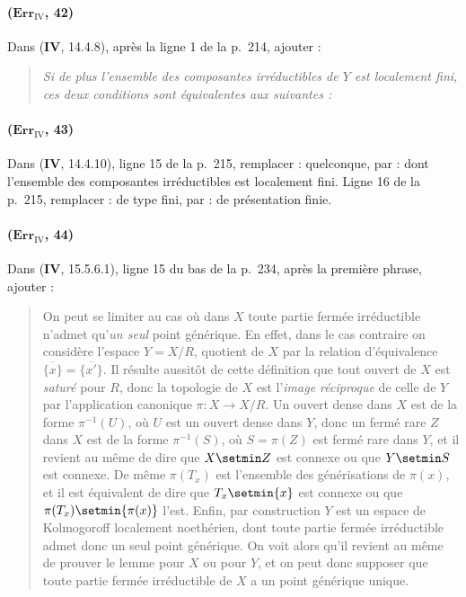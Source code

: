 \paragraph{($\mathbf{Err}_{\mathrm{IV}}$, 42)}
Dans (\textbf{IV}, 14.4.8), après la ligne 1 de la p.~214, ajouter :
\begin{quote}
\emph{Si de plus l'ensemble des composantes irréductibles de $Y$ est
localement fini, ces deux conditions sont équivalentes aux suivantes :}
\end{quote}

\paragraph{($\mathbf{Err}_{\mathrm{IV}}$, 43)}
Dans (\textbf{IV}, 14.4.10), ligne 15 de la p.~215, remplacer : quelconque, par :
dont l'ensemble des composantes irréductibles est localement fini.
Ligne 16 de la p.~215, remplacer : de type fini, par : de présentation
finie.

\paragraph{($\mathbf{Err}_{\mathrm{IV}}$, 44)}
Dans (\textbf{IV}, 15.5.6.1), ligne 15 du bas de la p.~234, après la première
phrase, ajouter :

\begin{quote}
On peut se limiter au cas où dans $X$ toute partie fermée irréductible
n'admet qu'\emph{un seul} point générique. En effet, dans le cas contraire on
considère l'espace $Y=X/R$,
quotient de $X$ par la relation d'équivalence
$\overline{\{x\}}=\overline{\{x'\}}$. Il résulte aussitôt de cette
définition que tout ouvert de $X$ est \emph{saturé} pour $R$, donc la topologie
de $X$ est l'\emph{image réciproque} de celle de $Y$ par l'application
canonique $\pi:X\to X/R$. Un ouvert dense dans $X$ est de la forme
$\pi^{-1}(U)$, où $U$ est un ouvert dense dans $Y$, donc un fermé rare
$Z$ dans $X$ est de la forme $\pi^{-1}(S)$, où $S=\pi(Z)$ est fermé
rare dans $Y$, et il revient au même de dire que $X\setmin Z$ est connexe ou
que $Y\setmin S$ est connexe. De même $\pi(T_x)$ est l'ensemble des
générisations de $\pi(x)$, et il est équivalent de dire que
$T_x\setmin\{x\}$ est connexe ou que $\pi(T_x)\setmin\{\pi(x)\}$ l'est. Enfin, par
construction $Y$ est un espace de Kolmogoroff localement noethérien,
dont toute partie fermée irréductible admet donc un seul point générique. On voit
alors qu'il revient au même de prouver le lemme pour $X$ ou pour $Y$,
et on peut donc supposer que toute partie fermée irréductible de $X$ a
un point générique unique.
\end{quote}

